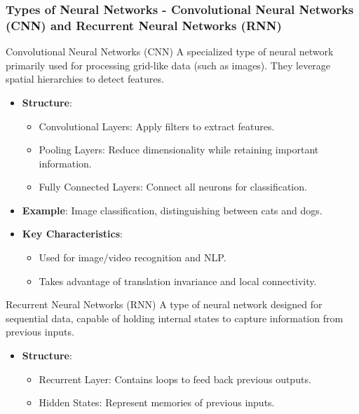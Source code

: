 \documentclass[aspectratio=169]{beamer}
\begin{document}
\begin{frame}[fragile]
    \frametitle{Types of Neural Networks - Convolutional Neural Networks (CNN) and Recurrent Neural Networks (RNN)}
    \begin{block}{Convolutional Neural Networks (CNN)}
        A specialized type of neural network primarily used for processing grid-like data (such as images). They leverage spatial hierarchies to detect features.
    \end{block}
    
    \begin{itemize}
        \item \textbf{Structure}:
        \begin{itemize}
            \item Convolutional Layers: Apply filters to extract features.
            \item Pooling Layers: Reduce dimensionality while retaining important information.
            \item Fully Connected Layers: Connect all neurons for classification.
        \end{itemize}
        
        \item \textbf{Example}: Image classification, distinguishing between cats and dogs.
        
        \item \textbf{Key Characteristics}:
        \begin{itemize}
            \item Used for image/video recognition and NLP.
            \item Takes advantage of translation invariance and local connectivity.
        \end{itemize}
    \end{itemize}
    
    \begin{block}{Recurrent Neural Networks (RNN)}
        A type of neural network designed for sequential data, capable of holding internal states to capture information from previous inputs.
    \end{block}
    
    \begin{itemize}
        \item \textbf{Structure}:
        \begin{itemize}
            \item Recurrent Layer: Contains loops to feed back previous outputs.
            \item Hidden States: Represent memories of previous inputs.
        \end{itemize}
        

\end{itemize}
\end{frame}
\end{document}
